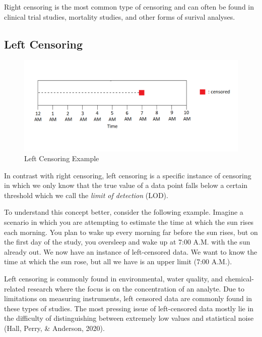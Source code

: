\documentclass[12pt, twoside]{amherstthesis}
\begin{document}
Right censoring is the most common type of censoring and can often be found in clinical trial studies, mortality studies, and other forms of surival analyses.

\hypertarget{left}{%
\subsection{Left Censoring}\label{left}}
\begin{figure}

{\centering \includegraphics[width=1\linewidth]{figures/left_censoring_example_fix} 

}

\caption{Left Censoring Example}\label{fig:leftcensoringexample}
\end{figure}
In contrast with right censoring, left censoring is a specific instance of censoring in which we only know that the true value of a data point falls below a certain threshold which we call the \emph{limit of detection} (LOD).

To understand this concept better, consider the following example. Imagine a scenario in which you are attempting to estimate the time at which the sun rises each morning. You plan to wake up every morning far before the sun rises, but on the first day of the study, you oversleep and wake up at 7:00 A.M. with the sun already out. We now have an instance of left-censored data. We want to know the time at which the sun rose, but all we have is an upper limit (7:00 A.M.).

Left censoring is commonly found in environmental, water quality, and chemical-related research where the focus is on the concentration of an analyte. Due to limitations on measuring instruments, left censored data are commonly found in these types of studies. The most pressing issue of left-censored data mostly lie in the difficulty of distinguishing between extremely low values and statistical noise (Hall, Perry, \& Anderson, 2020).
\end{document}
